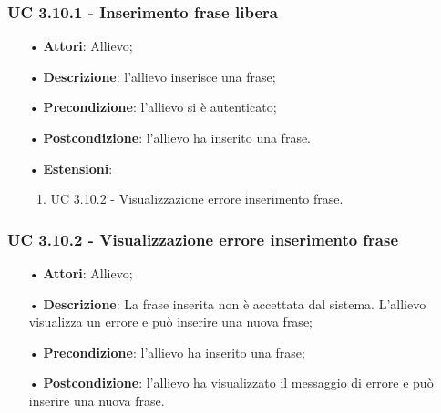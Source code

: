 \subsubsection{UC 3.10.1 - Inserimento frase libera}
\begin{itemize}
	\item[•]\textbf{Attori}: Allievo;
	\item[•]\textbf{Descrizione}: l'allievo inserisce una frase;
	\item[•]\textbf{Precondizione}: l'allievo si è autenticato;
	\item[•]\textbf{Postcondizione}: l'allievo ha inserito una frase.
	\item[•]\textbf{Estensioni}:
	\begin{enumerate}
		\item UC 3.10.2 - Visualizzazione errore inserimento frase.
	\end{enumerate}
\end{itemize}

\subsubsection{UC 3.10.2 - Visualizzazione errore inserimento frase}
\begin{itemize}
	\item[•]\textbf{Attori}: Allievo;
	\item[•]\textbf{Descrizione}: La frase inserita non è accettata dal sistema. L'allievo visualizza un errore e può inserire una nuova frase;
	\item[•]\textbf{Precondizione}: l'allievo ha inserito una frase;
	\item[•]\textbf{Postcondizione}: l'allievo ha visualizzato il messaggio di errore e può inserire una nuova frase.
\end{itemize}

